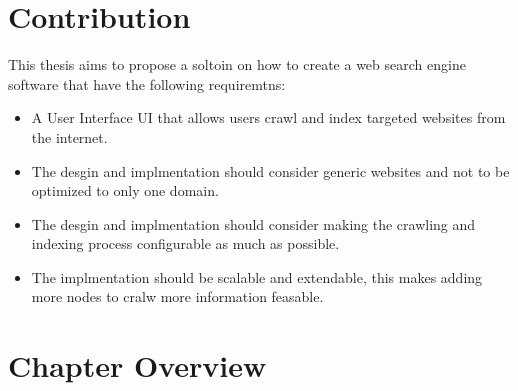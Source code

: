 \section{Contribution}

This thesis aims to propose a soltoin on how to create a web search engine software that have the following requiremtns: 
\begin{itemize}
  \item A User Interface UI that allows users crawl and index targeted websites from the internet.
\item The desgin and implmentation should consider generic websites and not to be optimized to only one domain.
    \item The desgin and implmentation should consider making the crawling and indexing process configurable as much as possible.
    \item The implmentation should be scalable and extendable, this makes adding more nodes to cralw more information feasable.
\end{itemize}
\section{Chapter Overview}
